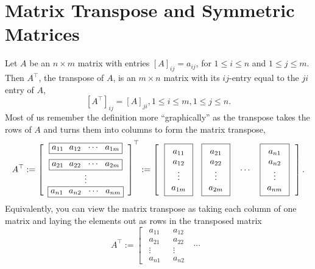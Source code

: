 \section{Matrix Transpose and Symmetric Matrices}
\label{sec:MAtrixTransposeSymmetricMatrices}
\begin{tcolorbox}[title=\textbf{Transpose of a Matrix}]
Let $A$ be an $n \times m$ matrix with entries $[A]_{ij}=a_{ij}$, for $1\le i \le n$ and $1 \le j \le m$. Then $A^\top$, the transpose of $A$, is an $m \times n$ matrix with its $ij$-entry equal to the $ji$ entry of $A$,
$$[A^\top]_{ij}=[A]_{ji},  1 \le i \le m,    1\le j \le n.$$
Most of us remember the definition more ``graphically'' as the transpose 
takes the rows of $A$ and turns them into columns to form the matrix transpose, 
$$
A^\top := \left[\begin{array}{c}\boxed{a_{11}~~ a_{12}~~ \cdots~~ a_{1m}} \medskip \\
\boxed{a_{21}~~ a_{22}~~ \cdots~~ a_{2m}} \\
\vdots \\
\boxed{a_{n1}~~ a_{n2}~~ \cdots~~ a_{nm}}\end{array}\right]^{\Huge \top} :=  \left[~~ \boxed{\begin{array}{c} a_{11} \\ a_{12}\\ \vdots \\ a_{1m}\end{array} }~~~
\boxed{\begin{array}{c} a_{21} \\ a_{22}\\ \vdots \\ a_{2m}\end{array} }~~~\cdots~~~
\boxed{\begin{array}{c} a_{n1} \\ a_{n2}\\ \vdots \\ a_{nm}\end{array}}~~\right].
$$
Equivalently, you can view the matrix transpose as taking each column of one matrix and laying the elements out as rows in the transposed matrix 
$$
 A^\top :=\left[ ~~\boxed{\begin{array}{c} a_{11} \\ a_{21}\\ \vdots \\ a_{n1}\end{array} }~~~
\boxed{\begin{array}{c} a_{12} \\ a_{22}\\ \vdots \\ a_{n2}\end{array} }~~~\cdots~~~
$$
\end{tcolorbox}

